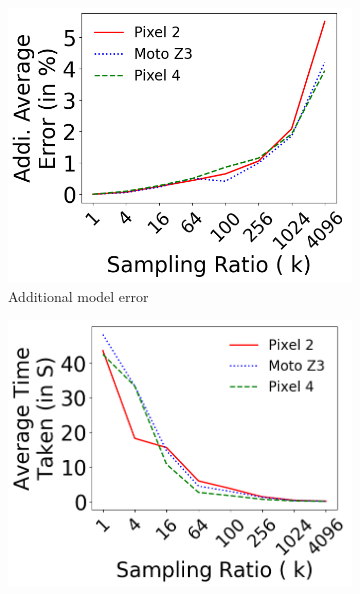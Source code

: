 
\begin{figure}[tp]
	\begin{subfigure}[]{0.48\columnwidth}
		\includegraphics[width=\columnwidth]{figure/001_sampling_ratio_error.png}
		\caption{Additional model error}
		\label{fig:eval_smapling_error_error}
	\end{subfigure}
	\begin{subfigure}[]{0.48\columnwidth}
 		\includegraphics[width=\columnwidth]{figure/002_sampling_ratio_time.png}

\end{subfigure}
\end{figure}

